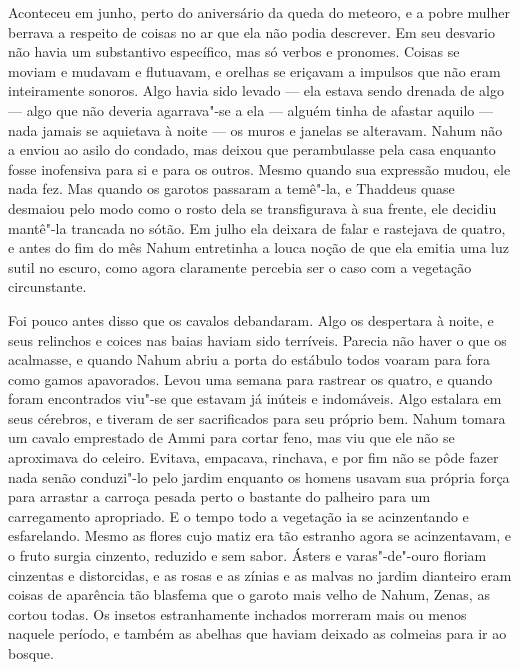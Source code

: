 Aconteceu em junho, perto do aniversário da queda do meteoro, e a pobre
mulher berrava a respeito de coisas no ar que ela não podia descrever.
Em seu desvario não havia um substantivo específico, mas só verbos e
pronomes. Coisas se moviam e mudavam e flutuavam, e orelhas se eriçavam
a impulsos que não eram inteiramente sonoros. Algo havia sido levado ---
ela estava sendo drenada de algo --- algo que não deveria agarrava"-se a
ela --- alguém tinha de afastar aquilo --- nada jamais se aquietava à
noite --- os muros e janelas se alteravam. Nahum não a enviou ao asilo
do condado, mas deixou que perambulasse pela casa enquanto fosse
inofensiva para si e para os outros. Mesmo quando sua expressão mudou,
ele nada fez. Mas quando os garotos passaram a temê"-la, e Thaddeus quase
desmaiou pelo modo como o rosto dela se transfigurava à sua frente, ele
decidiu mantê"-la trancada no sótão. Em julho ela deixara de falar e
rastejava de quatro, e antes do fim do mês Nahum entretinha a louca
noção de que ela emitia uma luz sutil no escuro, como agora claramente
percebia ser o caso com a vegetação circunstante.

Foi pouco antes disso que os cavalos debandaram. Algo os despertara à
noite, e seus relinchos e coices nas baias haviam sido terríveis.
Parecia não haver o que os acalmasse, e quando Nahum abriu a porta do
estábulo todos voaram para fora como gamos apavorados. Levou uma semana
para rastrear os quatro, e quando foram encontrados viu"-se que estavam
já inúteis e indomáveis. Algo estalara em seus cérebros, e tiveram de
ser sacrificados para seu próprio bem. Nahum tomara um cavalo emprestado
de Ammi para cortar feno, mas viu que ele não se aproximava do celeiro.
Evitava, empacava, rinchava, e por fim não se pôde fazer nada senão
conduzi"-lo pelo jardim enquanto os homens usavam sua própria força para
arrastar a carroça pesada perto o bastante do palheiro para um
carregamento apropriado. E o tempo todo a vegetação ia se acinzentando e
esfarelando. Mesmo as flores cujo matiz era tão estranho agora se
acinzentavam, e o fruto surgia cinzento, reduzido e sem sabor. Ásters e
varas"-de"-ouro floriam cinzentas e distorcidas, e as rosas e as zínias e
as malvas no jardim dianteiro eram coisas de aparência tão blasfema que
o garoto mais velho de Nahum, Zenas, as cortou todas. Os insetos
estranhamente inchados morreram mais ou menos naquele período, e também
as abelhas que haviam deixado as colmeias para ir ao bosque.

